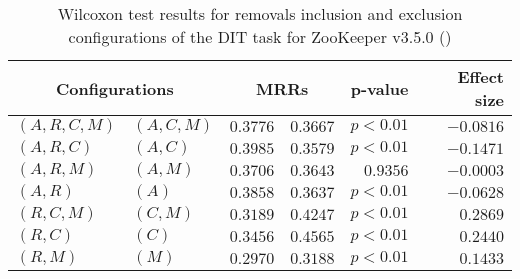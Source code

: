 
\begin{table}
\begin{spacing}{1.2}
\centering
\caption{Wilcoxon test results for removals inclusion and exclusion configurations of the DIT task for ZooKeeper v3.5.0 (\ctwo)}
\label{table:versus-wilcox-zookeeper-dit-removals}
\begin{tabular}{ll|rr|rr}
\toprule
      \multicolumn{2}{c|}{Configurations} &                \multicolumn{2}{c|}{MRRs} &             p-value & Effect size \\
\midrule
 $(A,R,C,M)$ &  $(A,C,M)$ &  $\bm{0.3776}$ &       $0.3667$ & $p<0.01$ &   $-0.0816$ \\
   $(A,R,C)$ &    $(A,C)$ &  $\bm{0.3985}$ &       $0.3579$ & $p<0.01$ &   $-0.1471$ \\
   $(A,R,M)$ &    $(A,M)$ &  $\bm{0.3706}$ &       $0.3643$ & $0.9356$ &   $-0.0003$ \\
     $(A,R)$ &      $(A)$ &  $\bm{0.3858}$ &       $0.3637$ & $p<0.01$ &   $-0.0628$ \\
   $(R,C,M)$ &    $(C,M)$ &       $0.3189$ &  $\bm{0.4247}$ & $p<0.01$ &    $0.2869$ \\
     $(R,C)$ &      $(C)$ &       $0.3456$ &  $\bm{0.4565}$ & $p<0.01$ &    $0.2440$ \\
     $(R,M)$ &      $(M)$ &       $0.2970$ &  $\bm{0.3188}$ & $p<0.01$ &    $0.1433$ \\
\bottomrule
\end{tabular}

\end{spacing}
\end{table}

